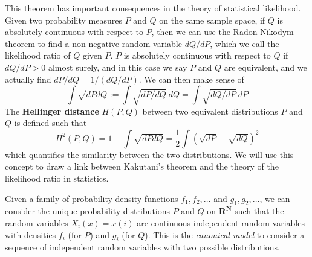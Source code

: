 \begin{example}
    This theorem has important consequences in the theory of statistical likelihood. Given two probability measures $P$ and $Q$ on the same sample space, if $Q$ is absolutely continuous with respect to $P$, then we can use the Radon Nikodym theorem to find a non-negative random variable $dQ/dP$, which we call the likelihood ratio of $Q$ given $P$. $P$ is absolutely continuous with respect to $Q$ if $dQ/dP > 0$ almost surely, and in this case we say $P$ and $Q$ are equivalent, and we actually find $dP/dQ = 1/(dQ/dP)$. We can then make sense of
%
\[ \int \sqrt{dP dQ} := \int \sqrt{dP/dQ}\ dQ = \int \sqrt{dQ/dP}\ dP \]
%
The {\bf Hellinger distance} $H(P,Q)$ between two equivalent distributions $P$ and $Q$ is defined such that
%
\[ H^2(P,Q) = 1 - \int \sqrt{dP dQ} = \frac{1}{2} \int \left( \sqrt{dP} - \sqrt{dQ} \right)^2 \]
%
which quantifies the similarity between the two distributions. We will use this concept to draw a link between Kakutani's theorem and the theory of the likelihood ratio in statistics.

Given a family of probability density functions $f_1, f_2, \dots$ and $g_1, g_2, \dots$, we can consider the unique probability distributions $P$ and $Q$ on $\mathbf{R}^{\mathbf{N}}$ such that the random variables $X_i(x) = x(i)$ are continuous independent random variables with densities $f_i$ (for $P$) and $g_i$ (for $Q$). This is the {\it canonical model} to consider a sequence of independent random variables with two possible distributions.


\end{example}
